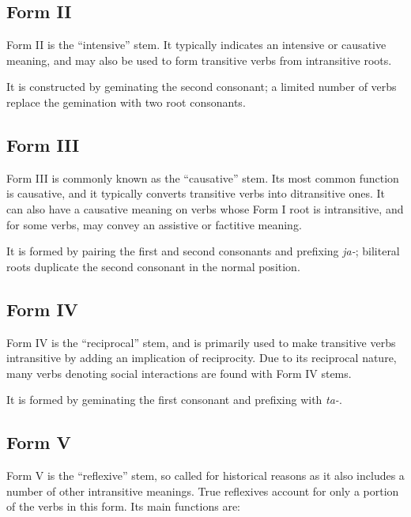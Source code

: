 \documentclass[grammar]{subfiles}
\begin{document}
  \subsection{Form II}
  \label{ssec:dev_verb_form_ii}

  Form II is the “intensive” stem. It typically indicates an intensive or causative meaning, and may also be used to form transitive verbs from intransitive roots.

  It is constructed by geminating the second consonant; a limited number of verbs replace the gemination with two root consonants.

  \subsection{Form III}
  \label{ssec:dev_verb_form_iii}

  Form III is commonly known as the “causative” stem. Its most common function is causative, and it typically converts transitive verbs into ditransitive ones. It can also have a causative meaning on verbs whose Form I root is intransitive, and for some verbs, may convey an assistive or factitive meaning.

  It is formed by pairing the first and second consonants and prefixing \textit{ja-}; biliteral roots duplicate the second consonant in the normal position.

  \subsection{Form IV}
  \label{ssec:dev_verb_form_iv}

  Form IV is the “reciprocal” stem, and is primarily used to make transitive verbs intransitive by adding an implication of reciprocity. Due to its reciprocal nature, many verbs denoting social interactions are found with Form IV stems. 

  It is formed by geminating the first consonant and prefixing with \textit{ta-}.


  \subsection{Form V}
  \label{ssec:dev_verb_form_v}

  Form V is the “reflexive” stem, so called for historical reasons as it also includes a number of other intransitive meanings. True reflexives account for only a portion of the verbs in this form. Its main functions are: 
\end{document}
